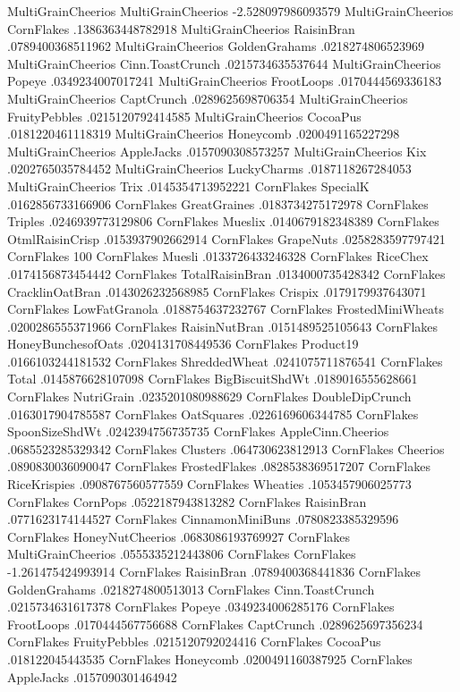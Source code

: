 MultiGrainCheerios	MultiGrainCheerios	-2.528097986093579
MultiGrainCheerios	CornFlakes	.1386363448782918
MultiGrainCheerios	RaisinBran	.0789400368511962
MultiGrainCheerios	GoldenGrahams	.0218274806523969
MultiGrainCheerios	Cinn.ToastCrunch	.0215734635537644
MultiGrainCheerios	Popeye	.0349234007017241
MultiGrainCheerios	FrootLoops	.0170444569336183
MultiGrainCheerios	CaptCrunch	.0289625698706354
MultiGrainCheerios	FruityPebbles	.0215120792414585
MultiGrainCheerios	CocoaPus	.0181220461118319
MultiGrainCheerios	Honeycomb	.0200491165227298
MultiGrainCheerios	AppleJacks	.0157090308573257
MultiGrainCheerios	Kix	.0202765035784452
MultiGrainCheerios	LuckyCharms	.0187118267284053
MultiGrainCheerios	Trix	.0145354713952221
CornFlakes	SpecialK	.0162856733166906
CornFlakes	GreatGraines	.0183734275172978
CornFlakes	Triples	.0246939773129806
CornFlakes	Mueslix	.0140679182348389
CornFlakes	OtmlRaisinCrisp	.0153937902662914
CornFlakes	GrapeNuts	.0258283597797421
CornFlakes	100%
CornFlakes	Muesli	.0133726433246328
CornFlakes	RiceChex	.0174156873454442
CornFlakes	TotalRaisinBran	.0134000735428342
CornFlakes	CracklinOatBran	.0143026232568985
CornFlakes	Crispix	.0179179937643071
CornFlakes	LowFatGranola	.0188754637232767
CornFlakes	FrostedMiniWheats	.0200286555371966
CornFlakes	RaisinNutBran	.0151489525105643
CornFlakes	HoneyBunchesofOats	.0204131708449536
CornFlakes	Product19	.0166103244181532
CornFlakes	ShreddedWheat	.0241075711876541
CornFlakes	Total	.0145876628107098
CornFlakes	BigBiscuitShdWt	.0189016555628661
CornFlakes	NutriGrain	.0235201080988629
CornFlakes	DoubleDipCrunch	.0163017904785587
CornFlakes	OatSquares	.0226169606344785
CornFlakes	SpoonSizeShdWt	.0242394756735735
CornFlakes	AppleCinn.Cheerios	.0685523285329342
CornFlakes	Clusters	.064730623812913
CornFlakes	Cheerios	.0890830036090047
CornFlakes	FrostedFlakes	.0828538369517207
CornFlakes	RiceKrispies	.0908767560577559
CornFlakes	Wheaties	.1053457906025773
CornFlakes	CornPops	.0522187943813282
CornFlakes	RaisinBran	.0771623174144527
CornFlakes	CinnamonMiniBuns	.0780823385329596
CornFlakes	HoneyNutCheerios	.0683086193769927
CornFlakes	MultiGrainCheerios	.0555335212443806
CornFlakes	CornFlakes	-1.261475424993914
CornFlakes	RaisinBran	.0789400368441836
CornFlakes	GoldenGrahams	.0218274800513013
CornFlakes	Cinn.ToastCrunch	.0215734631617378
CornFlakes	Popeye	.0349234006285176
CornFlakes	FrootLoops	.0170444567756688
CornFlakes	CaptCrunch	.0289625697356234
CornFlakes	FruityPebbles	.0215120792024416
CornFlakes	CocoaPus	.018122045443535
CornFlakes	Honeycomb	.0200491160387925
CornFlakes	AppleJacks	.0157090301464942
